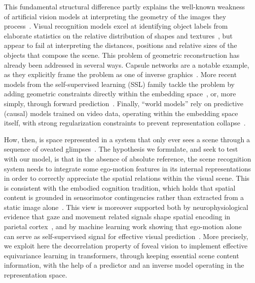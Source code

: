\documentclass{article}
\begin{document}
This fundamental structural difference partly explains the well-known weakness of artificial vision models at interpreting the geometry of the images they process~\cite{kamath2023whatsup,tong2024eyes}. Visual recognition models excel at identifying object labels from elaborate statistics on the relative distribution of shapes and textures~\cite{geirhos2019imagenet,baker2018deep}, but appear to fail at interpreting the distances, positions and relative sizes of the objects that compose the scene. This problem of geometric reconstruction has already been addressed in several ways. Capsule networks are a notable example, as they explicitly frame the problem as one of inverse graphics~\cite{hinton2011transforming,sabour2017dynamic,kulkarni2015deep}. More recent models from the self-supervised learning (SSL) family tackle the problem by adding geometric constraints directly within the embedding space~\cite{bardes2022vicregl}, or, more simply, through forward prediction~\cite{dangovski2022equivariant,garrido2023sie}. Finally, ``world models'' rely on predictive (causal) models trained on video data, operating within the embedding space itself, with strong regularization constraints to prevent representation collapse~\cite{ha2018world,lecun2022path,assran2023ijepa,bardes2024vjepa,balestriero2025lejepa}.

How, then, is space represented in a system that only ever sees a scene through a sequence of
oveated glimpses~\cite{bajcsy1988active,ballard1991animate}. The hypothesis we formulate, and seek to test with our model, is that in the absence of absolute reference, the scene recognition system needs to integrate some ego-motion features in its internal representations in order to correctly appreciate the spatial relations within the visual scene.  This is consistent with the embodied cognition tradition, which holds that spatial content is grounded in sensorimotor contingencies rather than extracted from a static image alone~\cite{oregan2001sensorimotor}. This view is moreover supported both by neurophysiological evidence that gaze and movement related signals shape spatial encoding in parietal cortex~\cite{andersen1985encoding,crapse2008corollary}, and by machine learning work showing that ego-motion  alone can serve as self-supervised signal for effective visual prediction~\cite{jayaraman2015learning,agrawal2015learning}. 
More precisely, we exploit here the decorrelation property of foveal vision to implement effective equivariance learning in transformers, through keeping essential scene content information, with the help of a predictor and an inverse model operating in the representation space.
\end{document}

